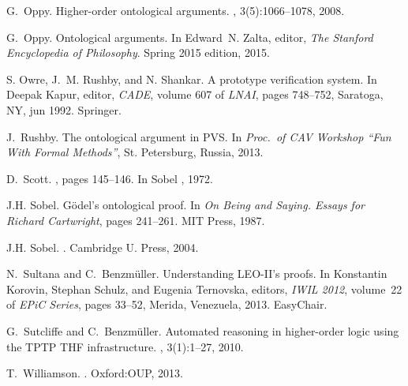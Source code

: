 \documentclass{article}
\begin{document}
\begin{thebibliography}{}
G.~Oppy.
\newblock Higher-order ontological arguments.
, 3(5):1066--1078, 2008.

G.~Oppy.
\newblock Ontological arguments.
\newblock In Edward~N. Zalta, editor, {\em The Stanford Encyclopedia of
  Philosophy}. Spring 2015 edition, 2015.

{S.} Owre, {J.}~{M.} Rushby, and {N.} Shankar.
 {A} prototype verification system.
\newblock In Deepak Kapur, editor, {\em CADE}, volume 607 of {\em LNAI}, pages
  748--752, Saratoga, {NY}, jun 1992. Springer.

J.~Rushby.
\newblock The ontological argument in {PVS}.
\newblock In {\em Proc.~of CAV Workshop ``Fun With Formal Methods''}, St.
  Petersburg, Russia, 2013.

D.~Scott.
, pages 145--146.
\newblock In Sobel , 1972.

J.H. Sobel.
\newblock G\"odel's ontological proof.
\newblock In {\em {On Being and Saying. Essays for Richard Cartwright}}, pages
  241--261. {MIT Press}, 1987.

J.H. Sobel.
.
\newblock Cambridge U. Press, 2004.

N.~Sultana and C.~Benzm{\"u}ller.
\newblock Understanding {LEO-II's} proofs.
\newblock In Konstantin Korovin, Stephan Schulz, and Eugenia Ternovska,
  editors, {\em IWIL 2012}, volume~22 of {\em EPiC Series}, pages 33--52,
  Merida, Venezuela, 2013. EasyChair.

G.~Sutcliffe and C.~Benzm{\"u}ller.
\newblock Automated reasoning in higher-order logic using the {TPTP THF}
  infrastructure.
, 3(1):1--27, 2010.

T.~Williamson.
.
\newblock Oxford:OUP, 2013.

\end{thebibliography}
\end{document}
